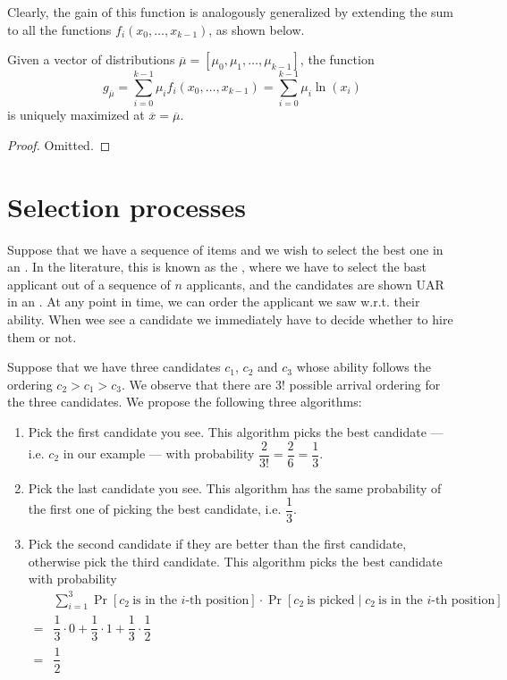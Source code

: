 \documentclass[a4paper, 12pt]{report}
\begin{document}
    Clearly, the gain of this function is analogously generalized by extending the sum to all the functions $f_i(x_0, \ldots, x_{k - 1})$, as shown below.

    \begin{framedthm}{}
        Given a vector of distributions $\overline \mu = [\mu_0, \mu_1, \ldots, \mu_{k - 1}]$, the function $$g_{\overline \mu}=\sum_{i = 0}^{k - 1}\mu_i f_i(x_0, \ldots, x_{k - 1}) = \sum_{ i = 0}^{k - 1}{\mu_i \ln (x_i)}$$ is uniquely maximized at $\overline x = \overline \mu$.
    \end{framedthm}

    \begin{proof}
        Omitted.
    \end{proof}

    \section{Selection processes}

    Suppose that we have a sequence of items and we wish to select the best one in an . In the literature, this is known as the , where we have to select the bast applicant out of a sequence of $n$ applicants, and the candidates are shown UAR in an . At any point in time, we can order the applicant we saw w.r.t. their ability. When wee see a candidate we immediately have to decide whether to hire them or not.

    Suppose that we have three candidates $c_1$, $c_2$ and $c_3$ whose ability follows the ordering $c_2 > c_1 > c_3$. We observe that there are 3! possible arrival ordering for the three candidates. We propose the following three algorithms:

    \begin{enumerate}
        \item Pick the first candidate you see. This algorithm picks the best candidate --- i.e. $c_2$ in our example --- with probability $\dfrac{2}{3!} = \dfrac{2}{6} = \dfrac{1}{3}$.
        \item Pick the last candidate you see. This algorithm has the same probability of the first one of picking the best candidate, i.e. $\dfrac{1}{3}$.
        \item Pick the second candidate if they are better than the first candidate, otherwise pick the third candidate. This algorithm picks the best candidate with probability
            \begin{equation*}
                \begin{split}
                      & \sum_{i = 1}^3{\Pr[c_2 \ \mbox{is in the $i$-th position}] \cdot \Pr[c_2 \ \mbox{is picked} \mid c_2 \ \mbox{is in the $i$-th position}]} \\
                    = & \dfrac{1}{3} \cdot 0 + \dfrac{1}{3} \cdot 1 + \dfrac{1}{3} \cdot \dfrac{1}{2} \\
                    = & \dfrac{1}{2}
                \end{split}
            \end{equation*}
    \end{enumerate}
    
\end{document}
